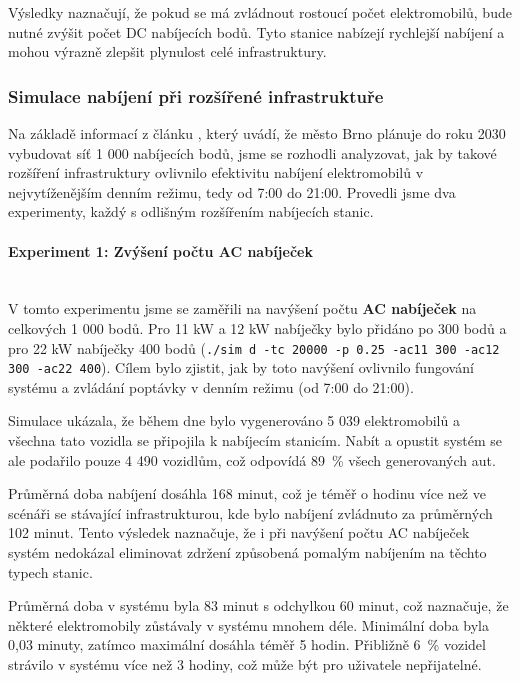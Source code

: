 \documentclass[a4paper,11pt]{article}
\begin{document}
Výsledky naznačují, že pokud se má zvládnout rostoucí počet elektromobilů, bude nutné zvýšit počet DC nabíjecích bodů. Tyto stanice nabízejí rychlejší nabíjení a mohou výrazně zlepšit plynulost celé infrastruktury.


\subsubsection{Simulace nabíjení při rozšířené infrastruktuře}

Na základě informací z článku \cite{ev_growth}, který uvádí, že město Brno plánuje do roku 2030 vybudovat síť 1 000 nabíjecích bodů, jsme se rozhodli analyzovat, jak by takové rozšíření infrastruktury ovlivnilo efektivitu nabíjení elektromobilů v nejvytíženějším denním režimu, tedy od 7:00 do 21:00. Provedli jsme dva experimenty, každý s odlišným rozšířením nabíjecích stanic.


\paragraph{Experiment 1: Zvýšení počtu AC nabíječek\\\\}
V tomto experimentu jsme se zaměřili na navýšení počtu \textbf{AC nabíječek} na celkových 1 000 bodů. Pro 11 kW a 12 kW nabíječky bylo přidáno po 300 bodů a pro 22 kW nabíječky 400 bodů (\texttt{./sim d -tc 20000 -p 0.25 -ac11 300 -ac12 300 -ac22 400}). Cílem bylo zjistit, jak by toto navýšení ovlivnilo fungování systému a zvládání poptávky v denním režimu (od 7:00 do 21:00).

Simulace ukázala, že během dne bylo vygenerováno 5 039 elektromobilů a všechna tato vozidla se připojila k nabíjecím stanicím. Nabít a opustit systém se ale podařilo pouze 4 490 vozidlům, což odpovídá 89~\% všech generovaných aut.

Průměrná doba nabíjení dosáhla 168 minut, což je téměř o hodinu více než ve scénáři se stávající infrastrukturou, kde bylo nabíjení zvládnuto za průměrných 102 minut. Tento výsledek naznačuje, že i při navýšení počtu AC nabíječek systém nedokázal eliminovat zdržení způsobená pomalým nabíjením na těchto typech stanic.

Průměrná doba v systému byla 83 minut s odchylkou 60 minut, což naznačuje, že některé elektromobily zůstávaly v systému mnohem déle. Minimální doba byla 0,03 minuty, zatímco maximální dosáhla téměř 5 hodin. Přibližně 6~\% vozidel strávilo v systému více než 3 hodiny, což může být pro uživatele nepřijatelné.
\end{document}
